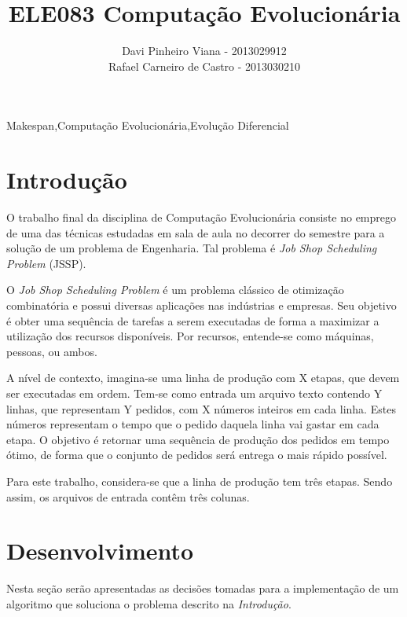 \documentclass[12pt]{elsarticle}
\begin{document}
	\begin{frontmatter}

		\title{ELE083 Computação Evolucionária\\ }
		\author{Davi Pinheiro Viana - 2013029912\\Rafael Carneiro de Castro - 2013030210}
		\address{Minas Gerais, Brasil}
		
		\begin{keyword}
			Makespan\sep Computação Evolucionária\sep Evolução Diferencial
		\end{keyword}
	\end{frontmatter}
	
	\section{Introdução}
	O trabalho final da disciplina de Computação Evolucionária consiste no emprego de uma das técnicas estudadas em sala de aula no decorrer do semestre para a solução de um problema de Engenharia. Tal problema é \textit{Job Shop Scheduling Problem} (JSSP).
	
	O \textit{Job Shop Scheduling Problem} é um problema clássico de otimização combinatória e possui diversas aplicações nas indústrias e empresas. Seu objetivo é obter uma sequência de tarefas a serem executadas de forma a maximizar a utilização dos recursos disponíveis. Por recursos, entende-se como máquinas, pessoas, ou ambos.
	
	A nível de contexto, imagina-se uma linha de produção com X etapas, que devem ser executadas em ordem. Tem-se como entrada um arquivo texto contendo Y linhas, que representam Y pedidos, com X números inteiros em cada linha. Estes números representam o tempo que o pedido daquela linha vai gastar em cada etapa. O objetivo é retornar uma sequência de produção dos pedidos em tempo ótimo, de forma que o conjunto de pedidos será entrega o mais rápido possível.
	
	Para este trabalho, considera-se que a linha de produção tem três etapas. Sendo assim, os arquivos de entrada contêm três colunas.

	\section{Desenvolvimento}
	Nesta seção serão apresentadas as decisões tomadas para a implementação de um algoritmo que soluciona o problema descrito na \textit{Introdução}.
	
\end{document}
